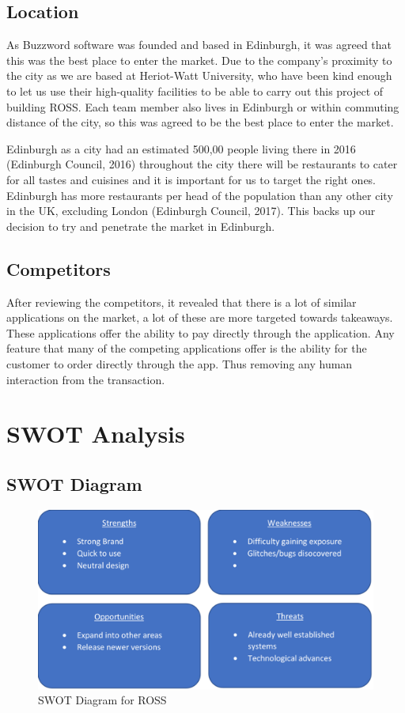 \documentclass[11pt, oneside, a4paper]{report}   %
\begin{document}
\begin{flushleft}
\subsection{Location}
As Buzzword software was founded and based in Edinburgh, it was agreed that this was the best place to enter the market. Due to the company’s proximity to the city as we are based at Heriot-Watt University, who have been kind enough to let us use their high-quality facilities to be able to carry out this project of building ROSS. Each team member also lives in Edinburgh or within commuting distance of the city, so this was agreed to be the best place to enter the market. 

Edinburgh as a city had an estimated 500,00 people living there in 2016 (Edinburgh Council, 2016) throughout the city there will be restaurants to cater for all tastes and cuisines and it is important for us to target the right ones. Edinburgh has more restaurants per head of the population than any other city in the UK, excluding London (Edinburgh Council, 2017). This backs up our decision to try and penetrate the market in Edinburgh. 

\subsection{Competitors}
After reviewing the competitors, it revealed that there is a lot of similar applications on the market, a lot of these are more targeted towards takeaways. These applications offer the ability to pay directly through the application. Any feature that many of the competing applications offer is the ability for the customer to order directly through the app. Thus removing any human interaction from the transaction.


\newpage

\section{SWOT Analysis}
\subsection{SWOT Diagram}
	\begin{figure}[!h]
	\centering
	\includegraphics[width=0.7\linewidth]{SWOT_Diagram}
	\caption{SWOT Diagram for ROSS}
	\label{fig:swotdiagram}
	\end{figure}


\end{flushleft}
\end{document}
